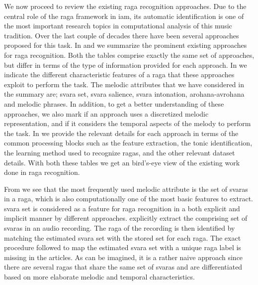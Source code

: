 We now proceed to review the existing \gls{raga} recognition approaches. Due to the central role of the \gls{raga} framework in \gls{iam}, its automatic identification is one of the most important research topics in computational analysis of this music tradition. Over the last couple of decades there have been several approaches proposed for this task. In  and  we summarize the prominent existing approaches for \gls{raga} recognition. Both the tables comprise exactly the same set of approaches, but differ in terms of the type of information provided for each approach. In  we indicate the different characteristic features of a \gls{raga} that these approaches exploit to perform the task. The melodic attributes that we have considered in the summary are; \gls{svara} set, \gls{svara} salience, \gls{svara} intonation, \gls{arohana}-\gls{avrohana} and melodic phrases. In addition, to get a better understanding of these approaches, we also mark if an approach uses a discretized melodic representation, and if it considers the temporal aspects of the melody to perform the task. In  we provide the relevant details for each approach in terms of the common processing blocks such as the feature extraction, the tonic identification, the learning method used to recognize \glspl{raga}, and the other relevant dataset details. With both these tables we get an bird's-eye view of the existing work done in \gls{raga} recognition.

From  we see that the most frequently used melodic attribute is the set of \glspl{svara} in a \gls{raga}, which is also computationally one of the most basic features to extract. \Gls{svara} set is considered as a feature for \gls{raga} recognition in a both explicit and implicit manner by different approaches. \citep{chakraborty2012object,ranjani2011carnatic} explicitly extract the comprising set of \glspl{svara} in an audio recording. The \gls{raga} of the recording is then identified by matching the estimated \gls{svara} set with the stored set for each \gls{raga}. The exact procedure followed to map the estimated \gls{svara} set with a unique \gls{raga} label is missing in the articles. As can be imagined, it is a rather naive approach since there are several \glspl{raga} that share the same set of \glspl{svara} and are differentiated based on more elaborate melodic and temporal characteristics.

